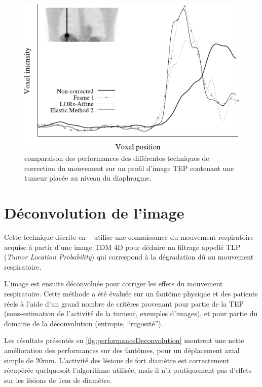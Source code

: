 \begin{figure}[h!]
	\begin{center}
		\includegraphics[width=12cm]{images/lamare2007list}
	\end{center}
	\caption{comparaison des performances des différentes techniques de correction du mouvement sur un profil d'image TEP contenant une tumeur placée au niveau du diaphragme.} 
	\label{fig:lamare2007}
\end{figure}


\section{Déconvolution de l'image}

Cette technique décrite en ~\cite{naqa2006deblurring} utilise une connaissance du mouvement respiratoire acquise à partir d'une image TDM 4D pour déduire un filtrage appellé TLP (\textit{Tumor Location Probability}) qui correspond à la dégradation dû au mouvement respiratoire.

L'image est ensuite déconvoluée pour corriger les effets du mouvement respiratoire. Cette méthode a été évaluée sur un fantôme physique et des patients réels à l'aide d'un grand nombre de critères provenant pour partie de la TEP (sous-estimation de l'activité de la tumeur, exemples d'images), et pour partie du domaine de la déconvolution (entropie, ``rugosité'').

Les résultats présentés en \ref{fig:performanceDeconvolution} montrent une nette amélioration des performances sur des fantômes, pour un déplacement axial simple de 20mm. L'activité des lésions de fort diamètre est correctement récupérée quelquesoit l'algorithme utilisée, mais il n'a pratiquement pas d'effets sur les lésions de 1cm de diamètre.

